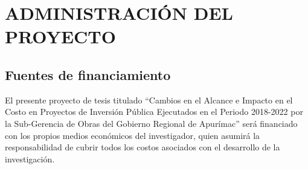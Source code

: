 \pagestyle{headings}
\chapter{ADMINISTRACIÓN DEL PROYECTO}

\section{Fuentes de financiamiento}

El presente proyecto de tesis titulado ``Cambios en el Alcance e Impacto en el Costo en Proyectos de Inversión Pública Ejecutados en el Periodo 2018-2022 por la Sub-Gerencia de Obras del Gobierno Regional de Apurímac'' será financiado con los propios medios económicos del investigador, quien asumirá la responsabilidad de cubrir todos los costos asociados con el desarrollo de la investigación.

